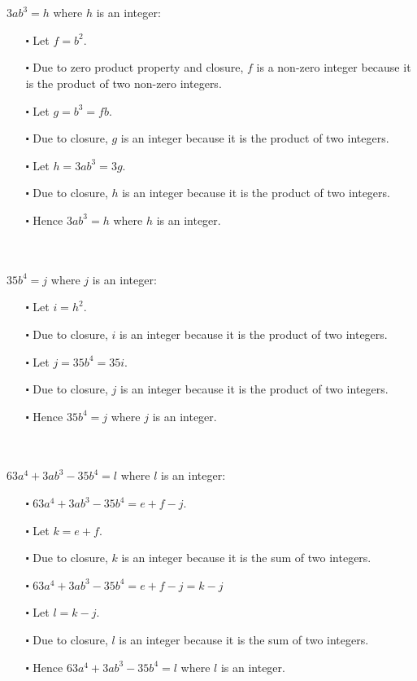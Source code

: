 \documentclass[12pt]{article}
\begin{document}
\newblock
\\ \\
$3ab^3 = h$ where $h$ is an integer:
\begin{itemize}
  \item [$\centerdot$] Let $f = b^2$.
  \item  [$\centerdot$] Due to zero product property and closure, $f$ is a non-zero integer because it is the product of two non-zero integers.
  \item [$\centerdot$] Let $g = b^3 = fb$.
  \item [$\centerdot$] Due to closure, $g$ is an integer because it is the product of two integers.
  \item [$\centerdot$] Let $h=3ab^3 = 3g$.
  \item [$\centerdot$] Due to closure, $h$ is an integer because it is the product of two integers.
  \item [$\centerdot$] Hence $3ab^3 = h$ where $h$ is an integer.
\end{itemize}
\newblock
\\ \\
$35b^4 = j$ where $j$ is an integer:
\begin{itemize}
  \item [$\centerdot$] Let $i = h^2$.
  \item [$\centerdot$] Due to closure, $i$ is an integer because it is the product of two integers.
  \item [$\centerdot$] Let $j = 35b^4 = 35i$.
  \item [$\centerdot$] Due to closure, $j$ is an integer because it is the product of two integers.
  \item [$\centerdot$] Hence $35b^4 = j$ where $j$ is an integer.
\end{itemize}
\newblock
\\ \\
$63a^4 + 3ab^3 - 35b^4=l$ where $l$ is an integer:
\begin{itemize}
  \item [$\centerdot$] $63a^4 + 3ab^3 - 35b^4 = e + f - j$.
  \item [$\centerdot$] Let $k = e + f$.
  \item [$\centerdot$] Due to closure, $k$ is an integer because it is the sum of two integers.
  \item [$\centerdot$] $63a^4 + 3ab^3 - 35b^4 = e + f - j = k - j$
  \item [$\centerdot$] Let $l = k-j$.
  \item [$\centerdot$] Due to closure, $l$ is an integer because it is the sum of two integers.
  \item [$\centerdot$] Hence $63a^4 + 3ab^3 - 35b^4 = l$ where $l$ is an integer.
\end{itemize}
\end{document}
